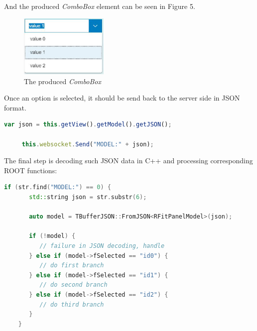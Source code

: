 \documentclass[a4paper]{jpconf}
\begin{document}
And the produced \textit{ComboBox} element can be seen in Figure 5.

\begin{figure}[h]
  \begin{center}
    \includegraphics[width=10pc]{testCombo.eps}\hspace{2pc}%
  \end{center}
  \centering
\begin{minipage}[b]{20pc}\caption{\label{label}The produced \textit{ComboBox}}
\end{minipage}
\end{figure}

Once an option is selected, it should be send back to the server side in JSON format.

\begin{lstlisting}[language=JavaScript,numbers=none]
     var json = this.getView().getModel().getJSON();

     this.websocket.Send("MODEL:" + json);
\end{lstlisting}

The final step is decoding such JSON data in C++ and processing corresponding ROOT functions:

\begin{lstlisting}[language=C++,numbers=none]
    if (str.find("MODEL:") == 0) {
       std::string json = str.substr(6);

       auto model = TBufferJSON::FromJSON<RFitPanelModel>(json);

       if (!model) {
          // failure in JSON decoding, handle
       } else if (model->fSelected == "id0") {
          // do first branch
       } else if (model->fSelected == "id1") {
          // do second branch
       } else if (model->fSelected == "id2") {
          // do third branch
       }
    }
\end{lstlisting}
\end{document}
